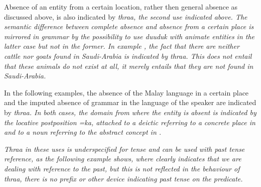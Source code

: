Absence of an entity from a certain location, rather then general absence as discussed above, is also indicated by \em thraa\em, the second use indicated above. The semantic difference between complete absence and absence from a certain place is mirrored in grammar by the possibility to use \em duuduk \em with animate entities in the latter case but not in the former.
In example , the fact that there are neither cattle nor goats found in Saudi-Arabia is indicated by \em thraa\em. This does not entail that these animals do not exist at all, it merely entails that they are not found in Saudi-Arabia.



In the following examples, the absence of the Malay language in a certain place and the imputed absence of grammar in the language of the speaker are indicated by \em thraa\em. In both cases, the domain from where the entity is absent is indicated by the locative postposition \em =ka\em, attached to a deictic referring to a concrete place in  and to a noun referring to the abstract concept  in .






\em Thraa \em in these uses is underspecified for tense and can be used with past tense reference, as the following example shows, where  clearly indicates that we are dealing with reference to the past, but this is not reflected in the behaviour of \em thraa\em, there is no prefix or other device indicating past tense on the predicate.


